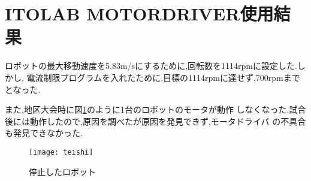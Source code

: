 \section{ITOLAB MOTORDRIVER使用結果}
ロボットの最大移動速度を5.83m/sにするために,回転数を1114rpmに設定した.しかし,
電流制限プログラムを入れたために,目標の1114rpmに達せず,700rpmまでとなった.

また,地区大会時に図\ref{fig:teishi}のように1台のロボットのモータが動作
しなくなった.試合後には動作したので,原因を調べたが原因を発見できず,モータドライバ
の不具合も発見できなかった.
\begin{figure}[H]
  \begin{center}
    \texttt{[image: teishi]}
    \end{center}
  \caption{停止したロボット}
 \label{fig:teishi}
\end{figure}
